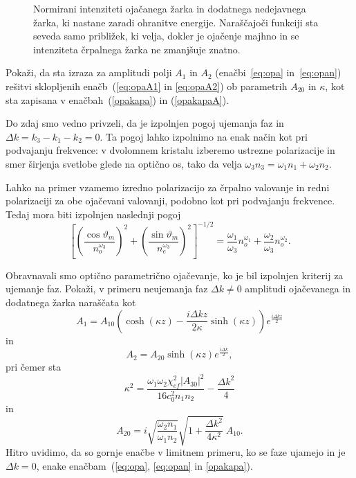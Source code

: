 \begin{figure}[h]
\centering
\def\svgwidth{90truemm} 

\caption{Normirani intenziteti ojačanega žarka in dodatnega nedejavnega žarka, ki nastane zaradi ohranitve
energije. Naraščajoči funkciji sta seveda samo približek, ki velja, dokler je ojačenje majhno in 
se intenziteta črpalnega žarka ne zmanjšuje znatno.}
\label{fig:opagraf}
\end{figure}

\begin{definition}
Pokaži, da sta izraza za amplitudi polji $A_1$ in $A_2$ (enačbi~\ref{eq:opa} in~\ref{eq:opan})
rešitvi sklopljenih enačb~(\ref{eq:opaA1} in \ref{eq:opaA2}) ob parametrih $A_{20}$ in $\kappa$,
kot sta zapisana v enačbah~(\ref{opakapa}) in (\ref{opakapaA}).
\end{definition}

Do zdaj smo vedno privzeli, da je izpolnjen pogoj ujemanja faz 
in $\Delta k=k_{3}-k_{1}-k_{2}=0$. 
Ta pogoj lahko izpolnimo na enak način kot pri podvajanju frekvence: v dvolomnem kristalu 
izberemo ustrezne polarizacije in smer širjenja svetlobe glede na optično os, 
tako da velja $\omega_{3}n_{3}=\omega_{1}n_{1}+\omega_{2}n_{2}$.

Lahko na primer vzamemo izredno polarizacijo za črpalno valovanje
in redni polarizaciji za obe ojačevani valovanji, podobno kot pri
podvajanju frekvence. Tedaj mora biti izpolnjen naslednji pogoj 
\begin{equation}
\left[\left(\frac{\cos\vartheta_{m}}{n_{o}^{\omega_{3}}}\right)^{2}
+\left(\frac{\sin\vartheta_{m}}{n_{e}^{\omega_{3}}}\right)^{2}\right]^{-1/2}=
\frac{\omega_{1}}{\omega_{3}}n_{o}^{\omega_{1}}+\frac{\omega_{2}}{\omega_{3}}n_{o}^{\omega_{2}}.
\label{8.34}
\end{equation}

\begin{definition}
Obravnavali smo optično parametrično ojačevanje, ko je bil izpolnjen kriterij za ujemanje faz. 
Pokaži, v primeru neujemanja faz $\Delta k \neq 0$ amplitudi ojačevanega in dodatnega 
žarka naraščata kot 
\begin{equation}
A_1 = A_{10} \left( \cosh(\kappa z) - \frac{i \Delta kz}{2 \kappa} \sinh (\kappa z) 
\right) e^{\frac{i \Delta kz}{2}}
\end{equation}
in
\begin{equation}
A_2 = A_{20} \sinh(\kappa z) e^{\frac{i \Delta k}{2}},
\end{equation}
pri čemer sta
\begin{equation}
\kappa^2 = \frac{\omega_1 \omega_2 \chi_{ef}^2|A_{30}|^2}
{16 c_0^2 n_1 n_2} - \frac{\Delta k^2}{4}
\end{equation}
in
\begin{equation}
A_{20} = i \sqrt{\frac{\omega_2 n_1}{\omega_1 n_2}} \sqrt{1 + \frac{\Delta k^2}{4 \kappa^2}}
~A_{10}.
\end{equation}
Hitro uvidimo, da so gornje enačbe v limitnem primeru, ko se faze ujamejo in je $\Delta k = 0$,
enake  enačbam~(\ref{eq:opa}, \ref{eq:opan} in \ref{opakapa}).
\end{definition}

